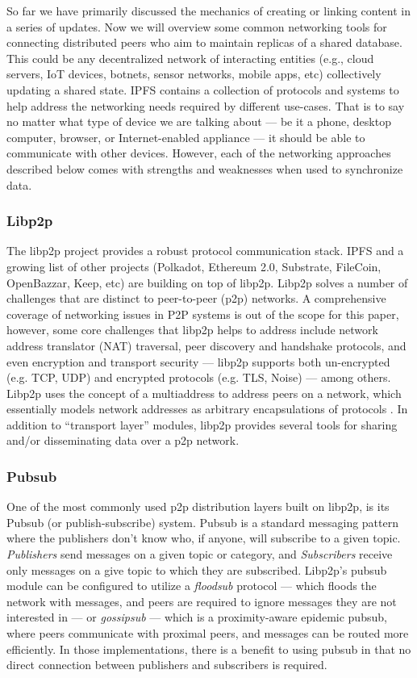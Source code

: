 \documentclass{textile}
\begin{document}
So far we have primarily discussed the mechanics of creating or linking content in a series of updates. Now we will overview some common networking tools for connecting distributed peers who aim to maintain replicas of a shared database. This could be any decentralized network of interacting entities (e.g., cloud servers, IoT devices, botnets, sensor networks, mobile apps, etc) collectively updating a shared state. IPFS contains a collection of protocols and systems to help address the networking needs required by different use-cases. That is to say no matter what type of device we are talking about --- be it a phone, desktop computer, browser, or Internet-enabled appliance --- it should be able to communicate with other devices. However, each of the networking approaches described below comes with strengths and weaknesses when used to synchronize data.

\subsubsection{Libp2p}

The libp2p project provides a robust protocol communication stack. IPFS and a growing list of other projects (Polkadot, Ethereum 2.0, Substrate, FileCoin, OpenBazzar, Keep, etc) are building on top of libp2p. Libp2p solves a number of challenges that are distinct to peer-to-peer (p2p) networks. A comprehensive coverage of networking issues in P2P systems is out of the scope for this paper, however, some core challenges that libp2p helps to address include network address translator \cite{srisureshIPNetworkAddress} (NAT) traversal, peer discovery and handshake protocols, and even encryption and transport security --- libp2p supports both un-encrypted (e.g. TCP, UDP) and encrypted protocols (e.g. TLS, Noise) --- among others. Libp2p uses the concept of a multiaddress to address peers on a network, which essentially models network addresses as arbitrary encapsulations of protocols \cite{multiformatsMultiaddr}. In addition to ``transport layer'' modules, libp2p provides several tools for sharing and/or disseminating data over a p2p network.

\subsubsection{Pubsub}

One of the most commonly used p2p distribution layers built on libp2p, is its Pubsub (or publish-subscribe) system. Pubsub is a standard messaging pattern where the publishers don't know who, if anyone, will subscribe to a given topic. \emph{Publishers} send messages on a given topic or category, and \emph{Subscribers} receive only messages on a give topic to which they are subscribed. Libp2p's pubsub module can be configured to utilize a \emph{floodsub} protocol --- which floods the network with messages, and peers are required to ignore messages they are not interested in --- or \emph{gossipsub} --- which is a proximity-aware epidemic pubsub, where peers communicate with proximal peers, and messages can be routed more efficiently. In those implementations, there is a benefit to using pubsub in that no direct connection between publishers and subscribers is required.
\end{document}
